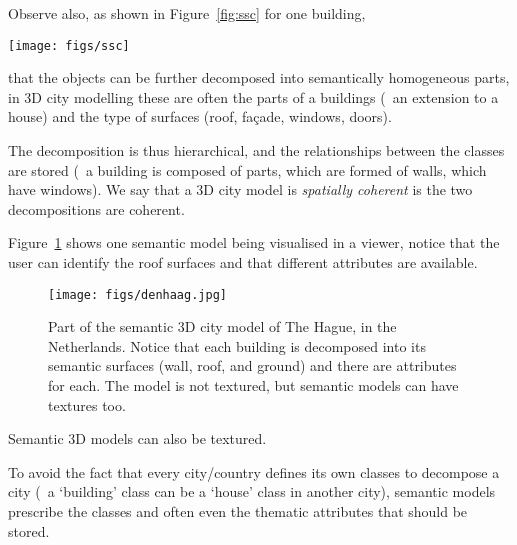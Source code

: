 %

Observe also, as shown in Figure~\ref{fig:ssc} for one building, 
\begin{figure*}
  \centering
  \texttt{[image: figs/ssc]}
  \caption{A building is semantically decomposed into different objects, and each objects is defined with geometry.}%
\label{fig:ssc}
\end{figure*}
that the objects can be further decomposed into semantically homogeneous parts, in 3D city modelling these are often the parts of a buildings (\eg\ an extension to a house) and the type of surfaces (roof, façade, windows, doors).

The decomposition is thus hierarchical, and the relationships between the classes are stored (\eg\ a building is composed of parts, which are formed of walls, which have windows). 
We say that a 3D city model is \emph{spatially coherent} is the two decompositions are coherent.

%

Figure~\ref{fig:denhaag} shows one semantic model being visualised in a viewer, notice that the user can identify the roof surfaces and that different attributes are available.
\begin{figure}
  \centering
  \texttt{[image: figs/denhaag.jpg]}
  \caption{Part of the semantic 3D city model of The Hague, in the Netherlands. Notice that each building is decomposed into its semantic surfaces (wall, roof, and ground) and there are attributes for each. The model is not textured, but semantic models can have textures too.}%
\label{fig:denhaag}
\end{figure}
Semantic 3D models can also be textured.

%

To avoid the fact that every city/country defines its own classes to decompose a city (\eg\ a `building' class can be a `house' class in another city), semantic models prescribe the classes and often even the thematic attributes that should be stored.




